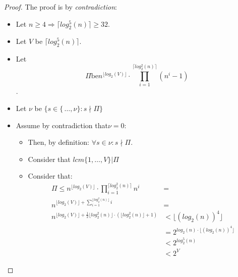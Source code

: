 \begin{proof}
    The proof is by \emph{contradiction}:
    \begin{itemize}
        \item Let $n \geq 4 \Rightarrow \lceil log_{2}^{5}(n) \rceil \geq 32$.
        \item Let $V$ be $\lceil log_{2}^{5}(n) \rceil$.
        \item Let \[\Pi \text{be} n^{\lfloor log_{2}(V) \rfloor} \cdot \prod_{i=1}^{\lceil log_{2}^{2}(n) \rceil}(n^{i} - 1) \].
        \item Let $\nu$ be $\{s \in \{\, \dots, \nu\}: s \nmid \Pi\}$
        \item Assume by contradiction that$ \nu = 0 $:
        \begin{itemize}
            \item Then, by definition: $\forall s \in \nu: s \nmid \Pi$.
            \item Consider that $lcm\{1, \dots, V\} | \Pi$
            \item Consider that:
            \begin{align}
                \Pi \leq n^{\lfloor log_{2}(V) \rfloor} \cdot \prod_{i=1}^{\lceil log_{2}^{2}(n) \rceil} n^{i} & =\\
                n^{\lfloor log_{2}(V) \rfloor + \sum_{i=1}^{\lfloor log_{2}^{2}(n) \rfloor} i} & =  \\
                n^{\lfloor log_{2}(V) \rfloor + \frac{1}{2} \lfloor log_{2}^{2}(n) \rfloor \cdot (\lfloor log_{2}^{2}(n) \rfloor + 1)}
                & < \lfloor (log_{2}(n))^{4} \rfloor \\
                & = 2^{log_{2}(n) \cdot \lfloor (log_{2}(n))^{4} \rfloor} \\
                & < 2^{log_{2}^{5}(n)} \\
                & < 2^{V}
            \end{align}


\end{itemize}
\end{itemize}
\end{proof}
